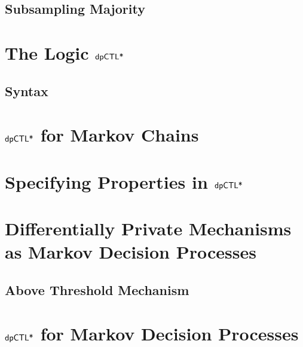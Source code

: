 \documentclass{llncs}
\begin{document}
\subsection{Subsampling Majority}
\label{subsection:subsampling}



\section{The Logic $\textsf{dpCTL*}$}
\label{section:dpCTL}


\subsection{Syntax}
\label{subsection:syntax}


\section{$\textsf{dpCTL*}$ for Markov Chains}
\label{section:semantics}


\section{Specifying Properties in $\textsf{dpCTL*}$}
\label{section:specifying-properties}


\section{Differentially Private Mechanisms as Markov Decision Processes}
\label{section:mdp}


\subsection{Above Threshold Mechanism}
\label{subsec:threshold}


\section{$\textsf{dpCTL*}$ for Markov Decision Processes}
\label{section:semantics-mdp}


%
\end{document}
